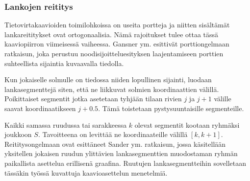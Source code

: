 \documentclass[finnish,12pt]{article}
\begin{document}
		\subsubsection{Lankojen reititys}

Tietovirtakaavioiden toimilohkoissa on useita portteja ja niitten sisältämät lankareititykset ovat ortogonaalisia.
Nämä rajoitukset tulee ottaa tässä kaaviopiirron viimeisessä vaiheessa.
Gansner ym. esittivät porttiongelmaan ratkaisun, joka perustuu noodisijoitteluesityksen laajentamiseen porttien suhteellista sijaintia kuvaavalla tiedolla.\cite{RefWorks:28}

Kun jokaiselle solmulle on tiedossa niiden lopullinen sijainti, luodaan lankasegmenttejä siten, että ne liikkuvat solmien koordinaattien välillä.
Poikittaiset segmentit jotka asetetaan tyhjään tilaan rivien $j$ ja $j+1$ välille saavat koordinaatikseen $j+0.5$.
Tämä toistetaan pystysuuntaisille segmenteille.

Kaikki samassa ruudussa tai sarakkeessa $k$ olevat segmentit kootaan ryhmäksi joukkoon $S$.
Tavoitteena on levittää ne koordinaateille välillä $[k, k+1]$.
Reititysongelmaan ovat esittäneet Sander ym. ratkaisun, jossa käsitellään yksitellen jokaisen ruudun ylittävien lankasegmenttien muodostaman ryhmän paikallista asettelua erillisenä graafina. \cite{RefWorks:17}
Ruutujen lankasegmentteihin sovelletaan tässäkin työssä kuvattuja kaavioasettelun menetelmiä.






\end{document}
